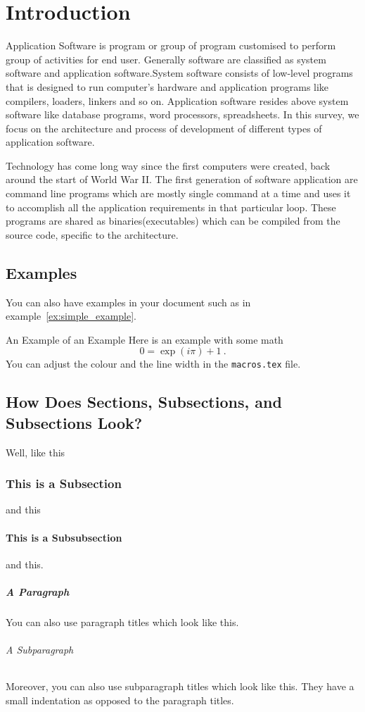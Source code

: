 \chapter{Introduction}\label{ch:introduction}
			  			Application	Software is program or group of program customised to perform group of activities for end user. Generally software are classified as system software and application software.System software consists of low-level programs that is designed to run computer's hardware and application programs like compilers, loaders, linkers and so on. Application software resides above system software like database programs, word processors, spreadsheets. In this survey, we focus on the architecture and process of development of different types of application software.
			
			Technology has come long way since the first computers were created, back around the start of World War II. The first generation of software application are command line programs which are mostly single command at a time and uses it to accomplish all the application requirements in that particular loop. These programs are shared as binaries(executables) which can be compiled from the source code, specific to the architecture. 


\section{Examples}
You can also have examples in your document such as in example~\ref{ex:simple_example}.
\begin{example}{An Example of an Example}
  \label{ex:simple_example}
  Here is an example with some math
  \begin{equation}
    0 = \exp(i\pi)+1\ .
  \end{equation}
  You can adjust the colour and the line width in the {\tt macros.tex} file.
\end{example}

\section{How Does Sections, Subsections, and Subsections Look?}
Well, like this
\subsection{This is a Subsection}
and this
\subsubsection{This is a Subsubsection}
and this.

\paragraph{A Paragraph}
You can also use paragraph titles which look like this.

\subparagraph{A Subparagraph} Moreover, you can also use subparagraph titles which look like this. They have a small indentation as opposed to the paragraph titles.

